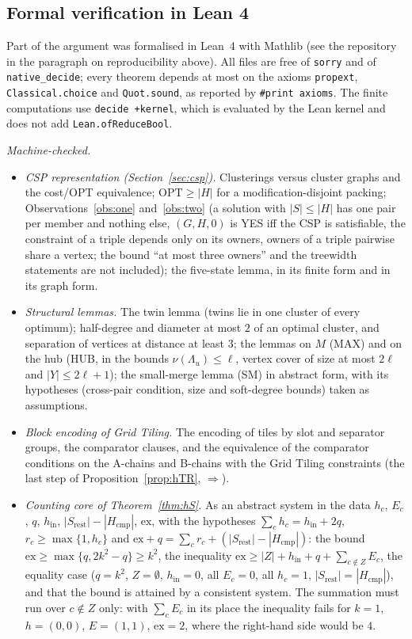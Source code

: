 \subsection{Formal verification in Lean 4}\label{sec:hlean}
Part of the argument was formalised in Lean~4 with Mathlib (see the repository in the paragraph on reproducibility above). All files are free of \texttt{sorry} and of \texttt{native\_decide}; every theorem depends at most on the axioms \texttt{propext}, \texttt{Classical.choice} and \texttt{Quot.sound}, as reported by \texttt{\#print axioms}. The finite computations use \texttt{decide +kernel}, which is evaluated by the Lean kernel and does not add \texttt{Lean.ofReduceBool}.

\emph{Machine-checked.}
\begin{itemize}
\item \emph{CSP representation (Section~\ref{sec:csp}).} Clusterings versus cluster graphs and the cost/OPT equivalence; $\mathrm{OPT}\ge|H|$ for a modification-disjoint packing; Observations~\ref{obs:one} and~\ref{obs:two} (a solution with $|S|\le|H|$ has one pair per member and nothing else, $(G,H,0)$ is YES iff the CSP is satisfiable, the constraint of a triple depends only on its owners, owners of a triple pairwise share a vertex; the bound ``at most three owners'' and the treewidth statements are not included); the five-state lemma, in its finite form and in its graph form.
\item \emph{Structural lemmas.} The twin lemma (twins lie in one cluster of every optimum); half-degree and diameter at most $2$ of an optimal cluster, and separation of vertices at distance at least $3$; the lemmas on $M$ (MAX) and on the hub (HUB, in the bounds $\nu(\Lambda_u)\le\ell$, vertex cover of size at most $2\ell$ and $|Y|\le2\ell+1$); the small-merge lemma (SM) in abstract form, with its hypotheses (cross-pair condition, size and soft-degree bounds) taken as assumptions.
\item \emph{Block encoding of Grid Tiling.} The encoding of tiles by slot and separator groups, the comparator clauses, and the equivalence of the comparator conditions on the A-chains and B-chains with the Grid Tiling constraints (the last step of Proposition~\ref{prop:hTR}, $\Rightarrow$).
\item \emph{Counting core of Theorem~\ref{thm:hS}.} As an abstract system in the data $h_c$, $E_c$, $q$, $h_{\mathrm{in}}$, $|S_{\mathrm{rest}}|-|H_{\mathrm{cmp}}|$, $\mathrm{ex}$, with the hypotheses $\sum_ch_c=h_{\mathrm{in}}+2q$, $r_c\ge\max\{1,h_c\}$ and $\mathrm{ex}+q=\sum_cr_c+(|S_{\mathrm{rest}}|-|H_{\mathrm{cmp}}|)$: the bound $\mathrm{ex}\ge\max\{q,2k^2-q\}\ge k^2$, the inequality $\mathrm{ex}\ge|Z|+h_{\mathrm{in}}+q+\sum_{c\notin Z}E_c$, the equality case ($q=k^2$, $Z=\emptyset$, $h_{\mathrm{in}}=0$, all $E_c=0$, all $h_c=1$, $|S_{\mathrm{rest}}|=|H_{\mathrm{cmp}}|$), and that the bound is attained by a consistent system. The summation must run over $c\notin Z$ only: with $\sum_cE_c$ in its place the inequality fails for $k=1$, $h=(0,0)$, $E=(1,1)$, $\mathrm{ex}=2$, where the right-hand side would be $4$.

\end{itemize}
